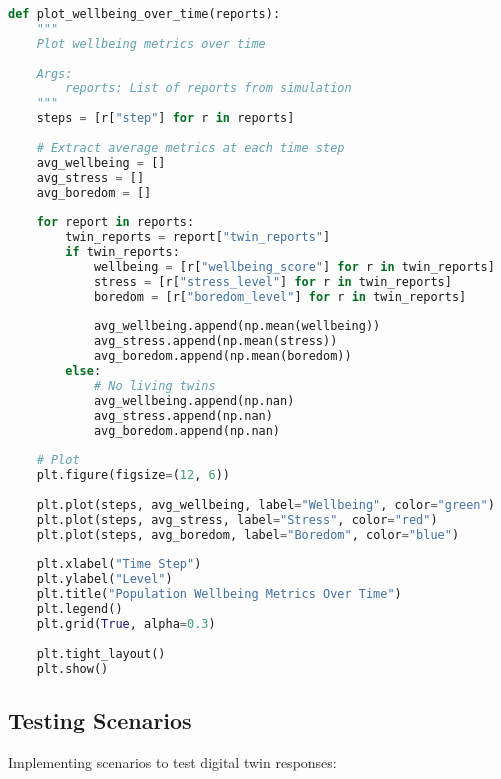 \documentclass[11pt,a4paper]{article}
\begin{document}
\begin{lstlisting}[language=Python]
def plot_wellbeing_over_time(reports):
    """
    Plot wellbeing metrics over time
    
    Args:
        reports: List of reports from simulation
    """
    steps = [r["step"] for r in reports]
    
    # Extract average metrics at each time step
    avg_wellbeing = []
    avg_stress = []
    avg_boredom = []
    
    for report in reports:
        twin_reports = report["twin_reports"]
        if twin_reports:
            wellbeing = [r["wellbeing_score"] for r in twin_reports]
            stress = [r["stress_level"] for r in twin_reports]
            boredom = [r["boredom_level"] for r in twin_reports]
            
            avg_wellbeing.append(np.mean(wellbeing))
            avg_stress.append(np.mean(stress))
            avg_boredom.append(np.mean(boredom))
        else:
            # No living twins
            avg_wellbeing.append(np.nan)
            avg_stress.append(np.nan)
            avg_boredom.append(np.nan)
    
    # Plot
    plt.figure(figsize=(12, 6))
    
    plt.plot(steps, avg_wellbeing, label="Wellbeing", color="green")
    plt.plot(steps, avg_stress, label="Stress", color="red")
    plt.plot(steps, avg_boredom, label="Boredom", color="blue")
    
    plt.xlabel("Time Step")
    plt.ylabel("Level")
    plt.title("Population Wellbeing Metrics Over Time")
    plt.legend()
    plt.grid(True, alpha=0.3)
    
    plt.tight_layout()
    plt.show()
\end{lstlisting}

\subsection{Testing Scenarios}
Implementing scenarios to test digital twin responses:
\end{document}
